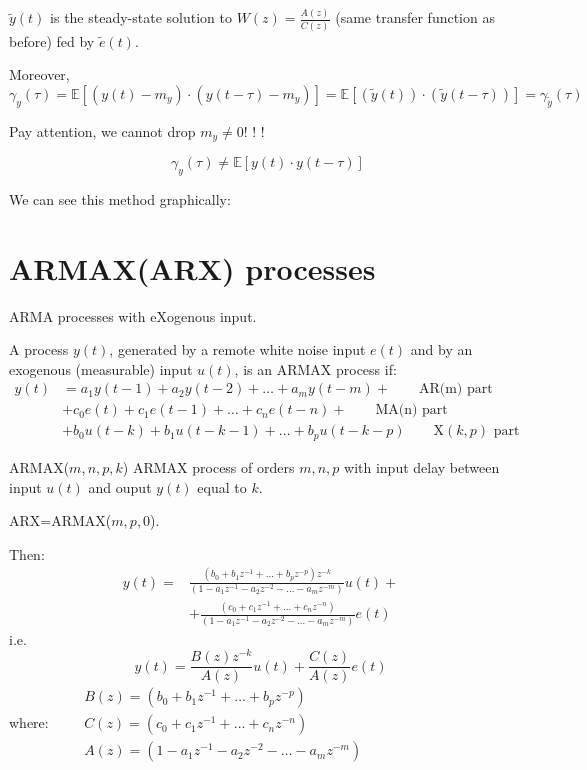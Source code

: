 $\tilde{y}(t)$ is the steady-state solution to $W(z)=\frac{A(z)}{C(z)}$ (same transfer function as before) fed by $\tilde{e}(t)$.

Moreover,
$$
\gamma_{y}(\tau)=\mathbb{E}\left[\left(y(t)-m_{y}\right) \cdot\left(y(t-\tau)-m_{y}\right)\right]=\mathbb{E}[(\tilde{y}(t)) \cdot(\tilde{y}(t-\tau))]=\gamma_{\tilde{y}}(\tau)
$$

Pay attention, we cannot drop $m_{y} \neq 0 $! ! ! 

$$\quad \gamma_{y}(\tau) \neq \mathbb{E}[y(t) \cdot y(t-\tau)]$$

We can see this method graphically:


\section{ARMAX(ARX) processes}
ARMA processes with eXogenous input.

A process $y(t)$, generated by a remote white noise input $e(t)$ and by an exogenous (measurable) input $u(t)$, is an ARMAX process if:
\begin{align*}
	y(t)&=a_{1} y(t-1)+a_{2} y(t-2)+\ldots+a_{m} y(t-m)+\quad\quad \text{AR(m) part}\\
	&+c_{0} e(t)+c_{1} e(t-1)+\ldots+c_{n} e(t-n)+\quad\quad \text{MA(n) part} \\
	&+b_{0} u(t-k)+b_{1} u(t-k-1)+\ldots+b_{p} u(t-k-p) \quad\quad \mathrm{X}(k, p) \text{ part}
\end{align*}

ARMAX($m,n,p,k$) ARMAX process of orders $m,n,p$ with input delay between input $u(t)$ and ouput $y(t)$ equal to $k$.

ARX=ARMAX($m,p,0$).

Then:
\begin{align*}
	y(t)=& \frac{\left(b_{0}+b_{1} z^{-1}+\ldots+b_{p} z^{-p}\right) z^{-k}}{\left(1-a_{1} z^{-1}-a_{2} z^{-2}-\ldots-a_{m} z^{-m}\right)} u(t)+\\
	&+\frac{\left(c_{0}+c_{1} z^{-1}+\ldots+c_{n} z^{-n}\right)}{\left(1-a_{1} z^{-1}-a_{2} z^{-2}-\ldots-a_{m} z^{-m}\right)} e(t)
\end{align*}
i.e.
$$
y(t)=\frac{B(z) z^{-k}}{A(z)} u(t)+\frac{C(z)}{A(z)} e(t)
$$
where:
$\begin{array}{ll}\quad & B(z)=\left(b_{0}+b_{1} z^{-1}+\ldots+b_{p} z^{-p}\right)\\
 & C(z)=\left(c_{0}+c_{1} z^{-1}+\ldots+c_{n} z^{-n}\right)\\
 & A(z)=\left(1-a_{1} z^{-1}-a_{2} z^{-2}-\ldots-a_{m} z^{-m}\right)\end{array}$

